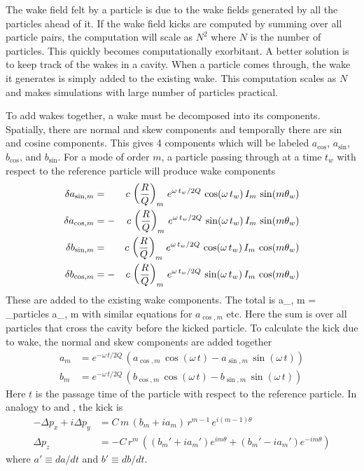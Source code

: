 The wake field felt by a particle is due to the wake fields generated by
all the particles ahead of it. If the wake field kicks are computed by
summing over all particle pairs, the
computation will scale as $N^2$ where $N$ is the number of
particles. This quickly becomes computationally exorbitant. A better
solution is to keep track of the wakes in a cavity. When a particle
comes through, the wake it generates is simply added to the existing
wake. This computation scales as $N$ and makes simulations with large
number of particles practical. 

To add wakes together, a wake must be decomposed into its
components.  Spatially, there are normal and skew components and
temporally there are sin and cosine components. This gives 4
components which will be labeled $a_{\cos}$, $a_{\sin}$, $b_{\cos}$,
and $b_{\sin}$. For a mode of order $m$, a particle passing through at
a time $t_w$ with respect to the reference particle will produce
wake components
\begin{alignat}{2}
  \delta a_{\sin, m} &=  &c \, \left( \frac{R}{Q} \right)_m \,
    e^{\omega \, t_w/ 2 Q} \, \cos (\omega \, t_w) \, I_m \, \sin(m \theta_w) 
    \nonumber \\
  \delta a_{\cos, m} &= -&c \, \left( \frac{R}{Q} \right)_m \,
    e^{\omega \, t_w/ 2 Q} \, \sin (\omega \, t_w) \, I_m \, \sin(m \theta_w) 
    \label{ac2rq} 
    \\
  \delta b_{\sin, m} &=  &c \, \left( \frac{R}{Q} \right)_m \,
    e^{\omega \, t_w/ 2 Q} \, \cos (\omega \, t_w) \, I_m \, \cos(m \theta_w) 
    \nonumber \\
  \delta b_{\cos, m} &= -&c \, \left( \frac{R}{Q} \right)_m \,
    e^{\omega \, t_w/ 2 Q} \, \sin (\omega \, t_w) \, I_m \, \cos(m \theta_w) 
    \nonumber
\end{alignat}
These are added to the existing wake components. The total is
\Begineq
  a_{\sin, m} = \sum_{\mbox{particles}} \delta a_{\sin, m}
\Endeq
with similar equations for $a_{\cos, m}$ etc. Here the sum is over all particles
that cross the cavity before the kicked particle. To calculate the kick
due to wake, the normal and skew components are added together
\begin{align}
  a_m &= e^{-\omega \, t/ 2 Q} \, \left( 
    a_{\cos, m} \, \cos (\omega \, t) - a_{\sin, m} \, \sin (\omega \, t) \right) 
    \label{akz2q} \\
  b_m &= e^{-\omega \, t/ 2 Q} \, \left(
    b_{\cos, m} \, \cos (\omega \, t) - b_{\sin, m} \, \sin (\omega \, t) \right) \nonumber 
\end{align}
Here $t$ is the passage time of the particle with respect to the
reference particle. In analogy to  and , the kick
is
\begin{align}
  -\Delta p_x + i\Delta p_y &= C \, 
    m \, (b_m + i a_m) \, r^{m-1} \, e^{i (m-1) \theta} 
    \label{ppcmbar} \\
  \Delta p_z &= -C \, r^m \, \left( 
    (b_m' + i a_m') e^{i m\theta} + (b_m' - i a_m') e^{-i m\theta} \right)
\end{align}
where $a' \equiv da/dt$ and $b' \equiv db/dt$.

